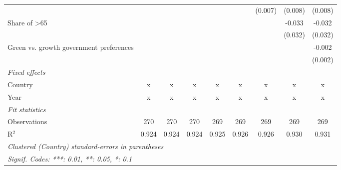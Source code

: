 \begin{table}[htbp]
\begin{tabular}{lcccccccc}
                                                    &         &         &         &         &         & (0.007) & (0.008) & (0.008)\\   
      Share of >65                                  &         &         &         &         &         &         & -0.033  & -0.032\\   
                                                    &         &         &         &         &         &         & (0.032) & (0.032)\\   
      Green vs. growth government preferences       &         &         &         &         &         &         &         & -0.002\\   
                                                    &         &         &         &         &         &         &         & (0.002)\\   
      \emph{Fixed effects}\\
      Country                                       & x       & x       & x       & x       & x       & x       & x       & x\\  
      Year                                          & x       & x       & x       & x       & x       & x       & x       & x\\  
      \midrule \emph{Fit statistics}\\
      Observations                                  & 270     & 270     & 270     & 269     & 269     & 269     & 269     & 269\\  
      R$^2$                                         & 0.924   & 0.924   & 0.924   & 0.925   & 0.926   & 0.926   & 0.930   & 0.931\\  
      \midrule
      \multicolumn{9}{l}{\emph{Clustered (Country) standard-errors in parentheses}}\\
      \multicolumn{9}{l}{\emph{Signif. Codes: ***: 0.01, **: 0.05, *: 0.1}}\\
   \end{tabular}
\end{table}


